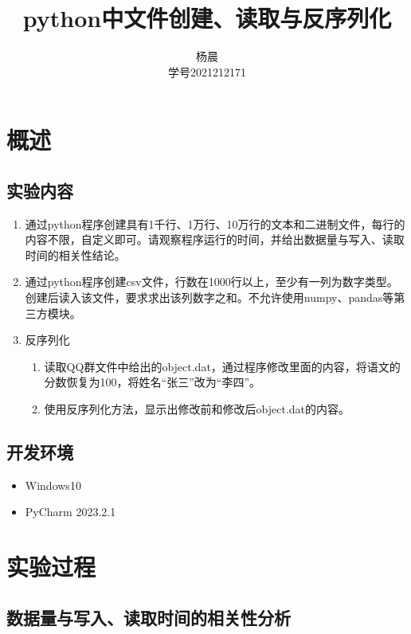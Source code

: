 \documentclass[lang=cn,11pt,a4paper]{elegantpaper}
\title{python中文件创建、读取与反序列化}
\author{杨晨 \\学号2021212171}
\institute{北京邮电大学 计算机学院}
\date{\zhtoday}
\begin{document}
\maketitle
\tableofcontents

\section{概述}

\subsection{实验内容}

\begin{enumerate}
    \item 通过python程序创建具有1千行、1万行、10万行的文本和二进制文件，每行的内容不限，自定义即可。请观察程序运行的时间，并给出数据量与写入、读取时间的相关性结论。
    \item  通过python程序创建csv文件，行数在1000行以上，至少有一列为数字类型。创建后读入该文件，要求求出该列数字之和。不允许使用numpy、pandas等第三方模块。
    \item  反序列化
    \begin{enumerate}
        \item 读取QQ群文件中给出的object.dat，通过程序修改里面的内容，将语文的分数恢复为100，将姓名“张三”改为“李四”。
        \item 使用反序列化方法，显示出修改前和修改后object.dat的内容。
    \end{enumerate}
\end{enumerate}

\subsection{开发环境}

\begin{itemize}
    \item Windows10
    \item PyCharm 2023.2.1
\end{itemize}

\section{实验过程}

\subsection{数据量与写入、读取时间的相关性分析}
\end{document}
